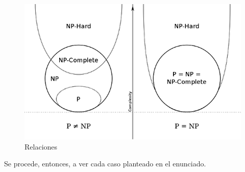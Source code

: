 \begin{figure}[H]
    \centering
    \includegraphics[width=1\textwidth]{capitulos/relaciones entero.png} 
    \caption{Relaciones}
\end{figure}

Se procede, entonces, a ver cada caso planteado en el enunciado.

